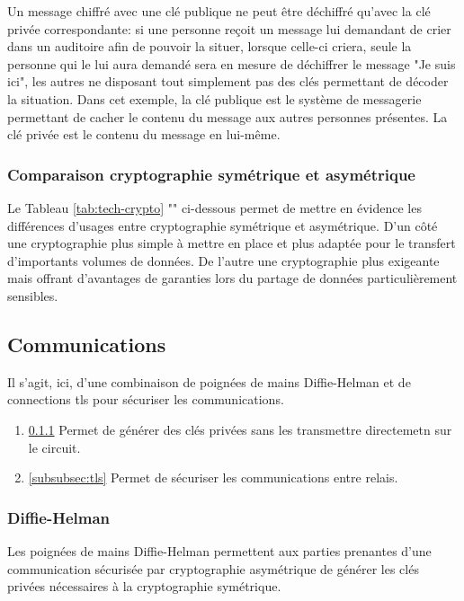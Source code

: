Un message chiffré avec une clé publique ne peut être déchiffré qu'avec la clé privée correspondante: si une personne reçoit un message lui demandant de crier dans un auditoire afin de pouvoir la situer, lorsque celle-ci criera, seule la personne qui le lui aura demandé sera en mesure de déchiffrer le message "Je suis ici", les autres ne disposant tout simplement pas des clés permettant de décoder la situation.
Dans cet exemple, la clé publique est le système de messagerie permettant de cacher le contenu du message aux autres personnes présentes. La clé privée est le contenu du message en lui-même.

\subsubsection{Comparaison cryptographie symétrique et asymétrique}

Le Tableau \ref{tab:tech-crypto} "" ci-dessous permet de mettre en évidence les différences d'usages entre cryptographie symétrique et asymétrique.
D'un côté une cryptographie plus simple à mettre en place et plus adaptée pour le transfert d'importants volumes de données.
De l'autre une cryptographie plus exigeante mais offrant d'avantages de garanties lors du partage de données particulièrement sensibles.




\newpage
\subsection{Communications}\label{subsec:comm}

Il s'agit, ici, d'une combinaison de poignées de mains Diffie-Helman et de connections \acrshort{tls} pour sécuriser les communications.
\begin{enumerate}
  \item \ref{subsubsec:dh}  Permet de générer des clés privées sans les transmettre directemetn sur le circuit.
  \item \ref{subsubsec:tls}  Permet de sécuriser les communications entre relais.
\end{enumerate}

\subsubsection{Diffie-Helman}\label{subsubsec:dh}

Les poignées de mains Diffie-Helman permettent aux parties prenantes d'une communication sécurisée par cryptographie asymétrique de générer les clés privées nécessaires à la cryptographie symétrique.

